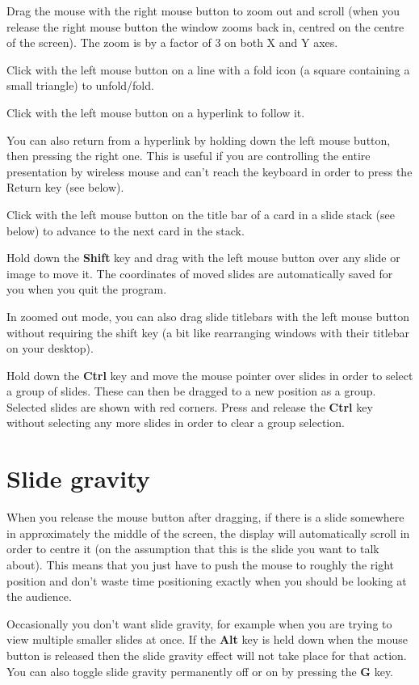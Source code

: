 \documentclass[12pt,a4paper,twoside]{article}
\renewcommand{\_}{\texttt{\symbol{95}}}
\begin{document}
Drag the mouse with the right mouse button to zoom out and scroll
(when you release the right mouse button the window zooms back in,
centred on the centre of the screen).
The zoom is by a factor of 3 on both X and Y axes.

Click with the left mouse button on a line with a fold icon (a square
containing a small triangle) to unfold/fold.

Click with the left mouse button on a hyperlink to follow it.

You can also return from a hyperlink by holding down the left mouse
button, then pressing the right one. This is useful if you are
controlling the entire presentation by wireless mouse and can't
reach the keyboard in order to press the Return key (see below).

Click with the left mouse button on the title bar of a card in a slide
stack (see below) to advance to the next card in the stack.

Hold down the \textbf{Shift} key and drag with the left mouse button over
any slide or image to move it. The coordinates of moved slides are
automatically saved for you when you quit the program.

In zoomed out mode, you can also drag slide titlebars with the left
mouse button without requiring the shift key (a bit like rearranging
windows with their titlebar on your desktop).

Hold down the \textbf{Ctrl} key and move the mouse pointer over slides
in order to select a group of slides. These can then be dragged to a
new position as a group. Selected slides are shown with red corners.
Press and release the \textbf{Ctrl} key without selecting any more
slides in order to clear a group selection.

\section{Slide gravity}

When you release the mouse button after dragging, if there is a slide
somewhere in approximately the middle of the screen, the display will
automatically scroll in order to centre it (on the assumption that this
is the slide you want to talk about). This means that you just have to
push the mouse to roughly the right position and don't waste time
positioning exactly when you should be looking at the audience.

Occasionally you don't want slide gravity, for example when you are
trying to view multiple smaller slides at once. If the \textbf{Alt} key
is held down when the mouse button is released then the slide gravity
effect will not take place for that action. You can also toggle slide
gravity permanently off or on by pressing the \textbf{G} key.
\end{document}

